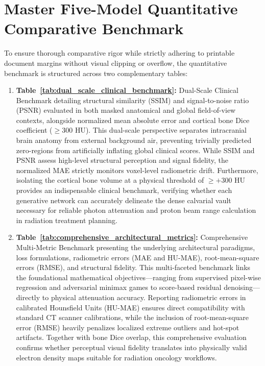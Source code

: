\section{Master Five-Model Quantitative Comparative Benchmark}
To ensure thorough comparative rigor while strictly adhering to printable document margins without visual clipping or overflow, the quantitative benchmark is structured across two complementary tables:
\begin{enumerate}
    \item \textbf{Table~\ref{tab:dual_scale_clinical_benchmark}:} Dual-Scale Clinical Benchmark detailing structural similarity (SSIM) and signal-to-noise ratio (PSNR) evaluated in both masked anatomical and global field-of-view contexts, alongside normalized mean absolute error and cortical bone Dice coefficient ($\ge 300\text{ HU}$). This dual-scale perspective separates intracranial brain anatomy from external background air, preventing trivially predicted zero-regions from artificially inflating global clinical scores. While SSIM and PSNR assess high-level structural perception and signal fidelity, the normalized MAE strictly monitors voxel-level radiometric drift. Furthermore, isolating the cortical bone volume at a physical threshold of $\ge +300\text{ HU}$ provides an indispensable clinical benchmark, verifying whether each generative network can accurately delineate the dense calvarial vault necessary for reliable photon attenuation and proton beam range calculation in radiation treatment planning.
    \item \textbf{Table~\ref{tab:comprehensive_architectural_metrics}:} Comprehensive Multi-Metric Benchmark presenting the underlying architectural paradigms, loss formulations, radiometric errors (MAE and HU-MAE), root-mean-square errors (RMSE), and structural fidelity. This multi-faceted benchmark links the foundational mathematical objectives---ranging from supervised pixel-wise regression and adversarial minimax games to score-based residual denoising---directly to physical attenuation accuracy. Reporting radiometric errors in calibrated Hounsfield Units (HU-MAE) ensures direct compatibility with standard CT scanner calibrations, while the inclusion of root-mean-square error (RMSE) heavily penalizes localized extreme outliers and hot-spot artifacts. Together with bone Dice overlap, this comprehensive evaluation confirms whether perceptual visual fidelity translates into physically valid electron density maps suitable for radiation oncology workflows.
\end{enumerate}

